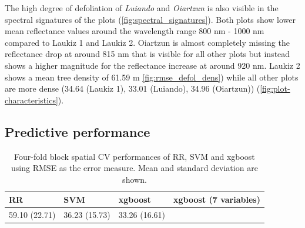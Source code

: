 \documentclass[review]{elsarticle}
\begin{document}
The high degree of defoliation of \textit{Luiando} and \textit{Oiartzun} is also visible in the spectral signatures of the plots (\autoref{fig:spectral_signatures}).
Both plots show lower mean reflectance values around the wavelength range 800 nm - 1000 nm compared to Laukiz 1 and Laukiz 2.
Oiartzun is almost completely missing the reflectance drop at around 815 nm that is visible for all other plots but instead shows a higher magnitude for the reflectance increase at around 920 nm.
Laukiz 2 shows a mean tree density of 61.59 m \autoref{fig:rmse_defol_dens}) while all other plots are more dense (34.64 (Laukiz 1), 33.01 (Luiando), 34.96 (Oiartzun)) (\autoref{fig:plot-characteristics}).

\subsection{Predictive performance}

\begin{table}[t!]
\centering
\caption[t]{Four-fold block spatial \ac{CV} performances of RR, SVM and xgboost using \ac{RMSE} as the error measure.
	Mean and standard deviation are shown.}
\begingroup\footnotesize
\begin{tabular}{llll}
	RR            & SVM           & xgboost       & xgboost (7 variables) \\
	\hline
	59.10 (22.71) & 36.23 (15.73) & 33.26 (16.61) &                       \\
	\bottomrule
\end{tabular}
\endgroup
\label{tab:model_comparison}
\end{table}
\end{document}
